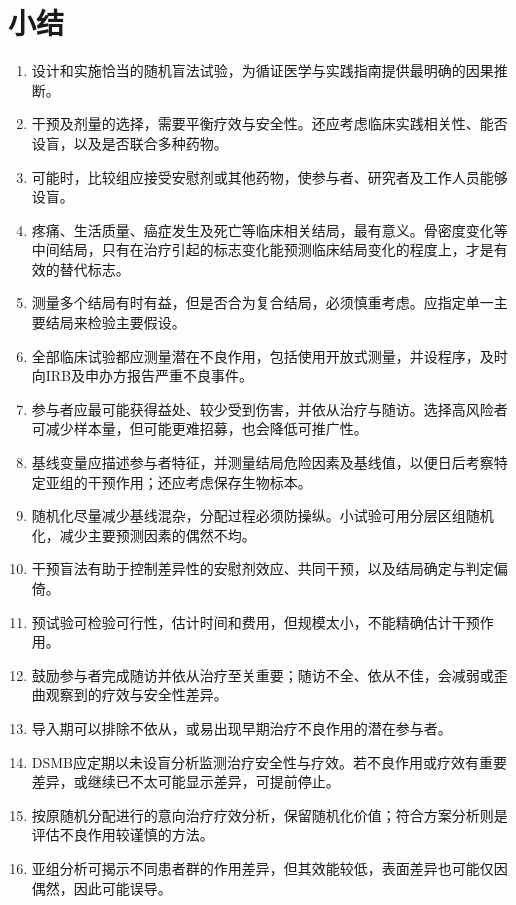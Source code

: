 \section{小结}
\begin{enumerate}
\item 设计和实施恰当的随机盲法试验，为循证医学与实践指南提供最明确的因果推断。
\item 干预及剂量的选择，需要平衡疗效与安全性。还应考虑临床实践相关性、能否设盲，以及是否联合多种药物。
\item 可能时，比较组应接受安慰剂或其他药物，使参与者、研究者及工作人员能够设盲。
\item 疼痛、生活质量、癌症发生及死亡等临床相关结局，最有意义。骨密度变化等中间结局，只有在治疗引起的标志变化能预测临床结局变化的程度上，才是有效的替代标志。
\item 测量多个结局有时有益，但是否合为复合结局，必须慎重考虑。应指定单一主要结局来检验主要假设。
\item 全部临床试验都应测量潜在不良作用，包括使用开放式测量，并设程序，及时向IRB及申办方报告严重不良事件。
\item 参与者应最可能获得益处、较少受到伤害，并依从治疗与随访。选择高风险者可减少样本量，但可能更难招募，也会降低可推广性。
\item 基线变量应描述参与者特征，并测量结局危险因素及基线值，以便日后考察特定亚组的干预作用；还应考虑保存生物标本。
\item 随机化尽量减少基线混杂，分配过程必须防操纵。小试验可用分层区组随机化，减少主要预测因素的偶然不均。
\item 干预盲法有助于控制差异性的安慰剂效应、共同干预，以及结局确定与判定偏倚。
\item 预试验可检验可行性，估计时间和费用，但规模太小，不能精确估计干预作用。
\item 鼓励参与者完成随访并依从治疗至关重要；随访不全、依从不佳，会减弱或歪曲观察到的疗效与安全性差异。
\item 导入期可以排除不依从，或易出现早期治疗不良作用的潜在参与者。
\item DSMB应定期以未设盲分析监测治疗安全性与疗效。若不良作用或疗效有重要差异，或继续已不太可能显示差异，可提前停止。
\item 按原随机分配进行的意向治疗疗效分析，保留随机化价值；符合方案分析则是评估不良作用较谨慎的方法。
\item 亚组分析可揭示不同患者群的作用差异，但其效能较低，表面差异也可能仅因偶然，因此可能误导。
\end{enumerate}


\endgroup
